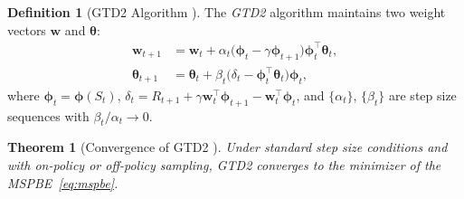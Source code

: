 \documentclass[11pt,a4paper]{article}
\theoremstyle{definition}
\newtheorem{definition}{Definition}[section]
\theoremstyle{plain}
\newtheorem{theorem}{Theorem}[section]
\theoremstyle{remark}
\begin{document}
\begin{definition}[GTD2 Algorithm {\cite{sutton2009}}]
\label{def:gtd2}
The \emph{GTD2} algorithm maintains two weight vectors $\bm{w}$ and $\bm{\theta}$:
\begin{align}
    \bm{w}_{t+1} &= \bm{w}_t + \alpha_t\bigl(\bm{\phi}_t - \gamma\bm{\phi}_{t+1}\bigr)\bm{\phi}_t^\top\bm{\theta}_t, \label{eq:gtd2_w}\\
    \bm{\theta}_{t+1} &= \bm{\theta}_t + \beta_t\bigl(\delta_t - \bm{\phi}_t^\top\bm{\theta}_t\bigr)\bm{\phi}_t, \label{eq:gtd2_theta}
\end{align}
where $\bm{\phi}_t = \bm{\phi}(S_t)$, $\delta_t = R_{t+1} + \gamma\bm{w}_t^\top\bm{\phi}_{t+1} - \bm{w}_t^\top\bm{\phi}_t$, and $\{\alpha_t\}$, $\{\beta_t\}$ are step size sequences with $\beta_t/\alpha_t \to 0$.
\end{definition}

\begin{theorem}[Convergence of GTD2 {\cite{sutton2009}}]
\label{thm:gtd2}
Under standard step size conditions and with on-policy or off-policy sampling, GTD2 converges to the minimizer of the MSPBE~\eqref{eq:mspbe}.
\end{theorem}
\end{document}
